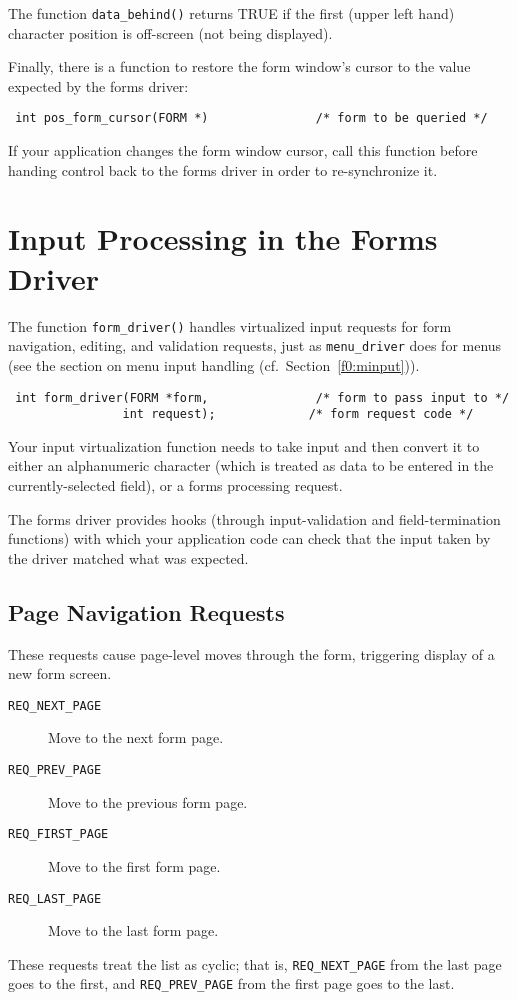 The function \texttt{data\_behind()} returns TRUE if the first (upper
left hand) character position is off-screen (not being displayed). 

Finally, there is a function to restore the form window's cursor to the
value expected by the forms driver:
\begin{verbatim} int pos_form_cursor(FORM *)               /* form to be queried */
\end{verbatim}
If your application changes the form window cursor, call this function before
handing control back to the forms driver in order to re-synchronize it.

\section{Input Processing in the Forms Driver}

\label{f0:fdriver}The function \texttt{form\_driver()} handles virtualized input requests
for form navigation, editing, and validation requests, just as
\texttt{menu\_driver} does for menus (see the section on menu input handling (cf.\ Section~\ref{f0:minput})).
\begin{verbatim} int form_driver(FORM *form,               /* form to pass input to */
                int request);             /* form request code */
\end{verbatim}
Your input virtualization function needs to take input and then convert it
to either an alphanumeric character (which is treated as data to be
entered in the currently-selected field), or a forms processing request. 

The forms driver provides hooks (through input-validation and
field-termination functions) with which your application code can check
that the input taken by the driver matched what was expected.

\subsection{Page Navigation Requests}

\label{f0:fpage}These requests cause page-level moves through the form,
triggering display of a new form screen.
\begin{description}
\item[ \texttt{REQ\_NEXT\_PAGE}]  Move to the next form page.
\item[ \texttt{REQ\_PREV\_PAGE}]  Move to the previous form page.
\item[ \texttt{REQ\_FIRST\_PAGE}]  Move to the first form page.
\item[ \texttt{REQ\_LAST\_PAGE}]  Move to the last form page.
\end{description}
These requests treat the list as cyclic; that is, \texttt{REQ\_NEXT\_PAGE}
from the last page goes to the first, and \texttt{REQ\_PREV\_PAGE} from
the first page goes to the last.

